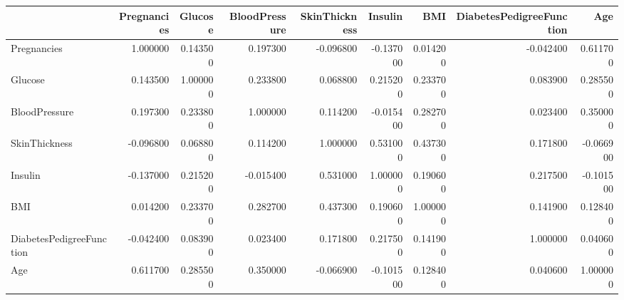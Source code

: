 \begin{tabular}{lrrrrrrrr}
\toprule
 & Pregnancies & Glucose & BloodPressure & SkinThickness & Insulin & BMI & DiabetesPedigreeFunction & Age \\
\midrule
Pregnancies & 1.000000 & 0.143500 & 0.197300 & -0.096800 & -0.137000 & 0.014200 & -0.042400 & 0.611700 \\
Glucose & 0.143500 & 1.000000 & 0.233800 & 0.068800 & 0.215200 & 0.233700 & 0.083900 & 0.285500 \\
BloodPressure & 0.197300 & 0.233800 & 1.000000 & 0.114200 & -0.015400 & 0.282700 & 0.023400 & 0.350000 \\
SkinThickness & -0.096800 & 0.068800 & 0.114200 & 1.000000 & 0.531000 & 0.437300 & 0.171800 & -0.066900 \\
Insulin & -0.137000 & 0.215200 & -0.015400 & 0.531000 & 1.000000 & 0.190600 & 0.217500 & -0.101500 \\
BMI & 0.014200 & 0.233700 & 0.282700 & 0.437300 & 0.190600 & 1.000000 & 0.141900 & 0.128400 \\
DiabetesPedigreeFunction & -0.042400 & 0.083900 & 0.023400 & 0.171800 & 0.217500 & 0.141900 & 1.000000 & 0.040600 \\
Age & 0.611700 & 0.285500 & 0.350000 & -0.066900 & -0.101500 & 0.128400 & 0.040600 & 1.000000 \\
\bottomrule
\end{tabular}
